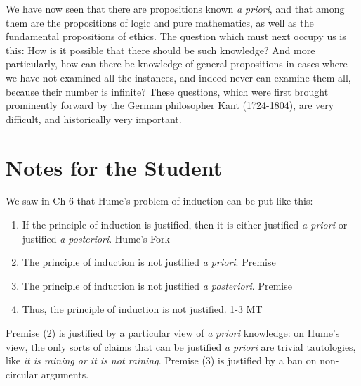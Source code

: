 \documentclass[oneside,letterpaper,12pt]{book}
\begin{document}
We have now seen that there are propositions known \emph{a priori}, and
that among them are the propositions of logic and pure mathematics, as
well as the fundamental propositions of ethics. The question which must
next occupy us is this: How is it possible that there should be such
knowledge? And more particularly, how can there be knowledge of general
propositions in cases where we have not examined all the instances, and
indeed never can examine them all, because their number is infinite?
These questions, which were first brought prominently forward by the
German philosopher Kant (1724-1804), are very difficult, and
historically very important.

\protect\hypertarget{link2HCH0008}{}{}

\pagebreak

\section{Notes for the Student}
We saw in Ch 6 that Hume's problem of induction can be put like this:
\begin{enumerate}
	\item If the principle of induction is justified, then it is either justified \textit{a priori} or justified \textit{a posteriori}. \hfill Hume's Fork
	\item The principle of induction is not justified \textit{a priori}. \hfill Premise
	\item The principle of induction is not justified \textit{a posteriori}. \hfill Premise
	\item Thus, the principle of induction is not justified. \hfill 1-3 MT
\end{enumerate}
Premise (2) is justified by a particular view of \textit{a priori} knowledge: on Hume's view, the only sorts of claims that can be justified \textit{a priori} are trivial tautologies, like \textit{it is raining or it is not raining}. Premise (3) is justified by a ban on non-circular arguments.
\end{document}
